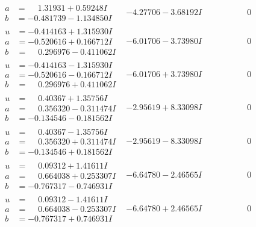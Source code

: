 \documentclass[1p]{elsarticle_modified}
\theoremstyle{definition}
\begin{document}
$$\begin{array}{c|c|c}
\begin{aligned}
a &= \phantom{-}1.31931 + 0.59248 I \\
b &= -0.481739 - 1.134850 I\end{aligned}
 & -4.27706 - 3.68192 I & \phantom{-0.000000 } 0 \\ \hline\begin{aligned}
u &= -0.414163 + 1.315930 I \\
a &= -0.520616 + 0.166712 I \\
b &= \phantom{-}0.296976 - 0.411062 I\end{aligned}
 & -6.01706 - 3.73980 I & \phantom{-0.000000 } 0 \\ \hline\begin{aligned}
u &= -0.414163 - 1.315930 I \\
a &= -0.520616 - 0.166712 I \\
b &= \phantom{-}0.296976 + 0.411062 I\end{aligned}
 & -6.01706 + 3.73980 I & \phantom{-0.000000 } 0 \\ \hline\begin{aligned}
u &= \phantom{-}0.40367 + 1.35756 I \\
a &= \phantom{-}0.356320 - 0.311474 I \\
b &= -0.134546 - 0.181562 I\end{aligned}
 & -2.95619 + 8.33098 I & \phantom{-0.000000 } 0 \\ \hline\begin{aligned}
u &= \phantom{-}0.40367 - 1.35756 I \\
a &= \phantom{-}0.356320 + 0.311474 I \\
b &= -0.134546 + 0.181562 I\end{aligned}
 & -2.95619 - 8.33098 I & \phantom{-0.000000 } 0 \\ \hline\begin{aligned}
u &= \phantom{-}0.09312 + 1.41611 I \\
a &= \phantom{-}0.664038 + 0.253307 I \\
b &= -0.767317 - 0.746931 I\end{aligned}
 & -6.64780 - 2.46565 I & \phantom{-0.000000 } 0 \\ \hline\begin{aligned}
u &= \phantom{-}0.09312 - 1.41611 I \\
a &= \phantom{-}0.664038 - 0.253307 I \\
b &= -0.767317 + 0.746931 I\end{aligned}
 & -6.64780 + 2.46565 I & \phantom{-0.000000 } 0 \\ \hline\begin{aligned}

\end{aligned}
\end{array}$$
\end{document}
